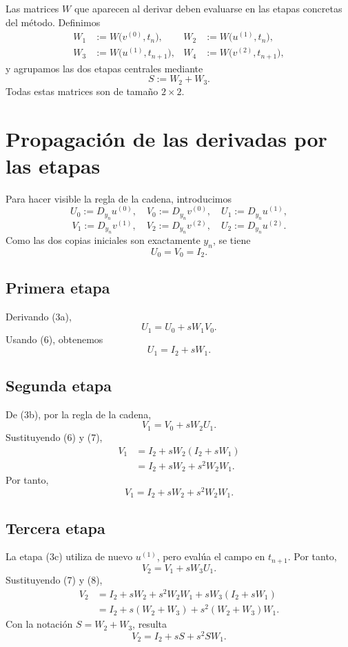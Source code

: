 \documentclass[11pt,a4paper]{article}
\newcommand{\Id}{I}
\begin{document}
Las matrices \(W\) que aparecen al derivar deben evaluarse en las etapas concretas
del método. Definimos
\begin{align*}
 W_1&:=W\bigl(v^{(0)},t_n\bigr),
 &W_2&:=W\bigl(u^{(1)},t_n\bigr),\\
 W_3&:=W\bigl(u^{(1)},t_{n+1}\bigr),
 &W_4&:=W\bigl(v^{(2)},t_{n+1}\bigr),
\end{align*}
y agrupamos las dos etapas centrales mediante
\[
 \boxed{S:=W_2+W_3.}
 \tag{5}
\]
Todas estas matrices son de tamaño \(2\times2\).

\section{Propagación de las derivadas por las etapas}

Para hacer visible la regla de la cadena, introducimos
\[
 U_0:=D_{y_n}u^{(0)},\quad
 V_0:=D_{y_n}v^{(0)},\quad
 U_1:=D_{y_n}u^{(1)},
\]
\[
 V_1:=D_{y_n}v^{(1)},\quad
 V_2:=D_{y_n}v^{(2)},\quad
 U_2:=D_{y_n}u^{(2)}.
\]
Como las dos copias iniciales son exactamente \(y_n\), se tiene
\[
 \boxed{U_0=V_0=\Id_2.}
 \tag{6}
\]

\subsection{Primera etapa}

Derivando (3a),
\[
 U_1
 =U_0+sW_1V_0.
\]
Usando (6), obtenemos
\[
 \boxed{U_1=\Id_2+sW_1.}
 \tag{7}
\]

\subsection{Segunda etapa}

De (3b), por la regla de la cadena,
\[
 V_1=V_0+sW_2U_1.
\]
Sustituyendo (6) y (7),
\begin{align*}
 V_1
 &=\Id_2+sW_2(\Id_2+sW_1)\\
 &=\Id_2+sW_2+s^2W_2W_1.
\end{align*}
Por tanto,
\[
 \boxed{V_1=\Id_2+sW_2+s^2W_2W_1.}
 \tag{8}
\]

\subsection{Tercera etapa}

La etapa (3c) utiliza de nuevo \(u^{(1)}\), pero evalúa el campo en
\(t_{n+1}\). Por tanto,
\[
 V_2=V_1+sW_3U_1.
\]
Sustituyendo (7) y (8),
\begin{align*}
 V_2
 &=\Id_2+sW_2+s^2W_2W_1
   +sW_3(\Id_2+sW_1)\\
 &=\Id_2+s(W_2+W_3)+s^2(W_2+W_3)W_1.
\end{align*}
Con la notación \(S=W_2+W_3\), resulta
\[
 \boxed{V_2=\Id_2+sS+s^2SW_1.}
 \tag{9}
\]
\end{document}
